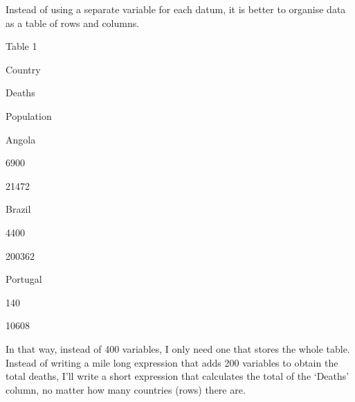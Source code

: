 \documentclass[letterpaper,10pt,english]{sphinxmanual}
\begin{document}
Instead of using a separate variable for each datum, it is better to organise data as a table of rows and columns.





Table 1









Country





Deaths





Population









Angola





6900





21472









Brazil





4400





200362









Portugal





140





10608









In that way, instead of 400 variables, I only need one that stores the whole table. Instead of writing a mile long expression that adds 200 variables to obtain the total deaths, I’ll write a short expression that calculates the total of the ‘Deaths’ column, no matter how many countries (rows) there are.
\end{document}
